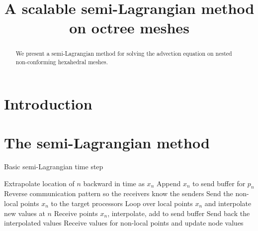 \documentclass[11pt]{article}
\title{A scalable semi-Lagrangian method on octree meshes}
\author{}
\begin{document}
\maketitle

\begin{abstract}
We present a semi-Lagrangian method for solving the advection equation
on nested non-conforming hexahedral meshes.
\end{abstract}

\section{Introduction}

\section{The semi-Lagrangian method}

\begin{algorithm}
  \caption{Basic semi-Lagrangian time step}
  \begin{algorithmic}
        \STATE Extrapolate location of $n$ backward in time as $x_n$
	\STATE Append $x_n$ to send buffer for $p_n$
	\ENDIF
      \ENDFOR
    \ENDFOR
    \STATE Reverse communication pattern so the receivers know the senders
    \STATE Send the non-local points $x_n$ to the target processors
    \STATE Loop over local points $x_n$ and interpolate new values at $n$
    \STATE Receive points $x_n$, interpolate, add to send buffer
    \STATE Send back the interpolated values
    \STATE Receive values for non-local points and update node values
  \end{algorithmic}
\end{algorithm}
\end{document}
